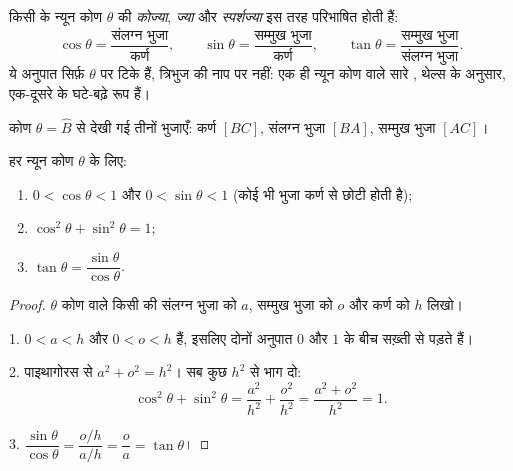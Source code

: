 \begin{definition}[त्रिकोणमितीय अनुपात]\label{def:g9:trig:ratios}
किसी  के न्यून कोण $\theta$ की \emph{कोज्या},
\emph{ज्या} और \emph{स्पर्शज्या} इस तरह
परिभाषित होती हैं:
\[
\cos\theta = \frac{\text{संलग्न भुजा}}{\text{कर्ण}},
\qquad
\sin\theta = \frac{\text{सम्मुख भुजा}}{\text{कर्ण}},
\qquad
\tan\theta = \frac{\text{सम्मुख भुजा}}{\text{संलग्न भुजा}} .
\]
ये अनुपात सिर्फ़ $\theta$ पर टिके हैं, त्रिभुज की नाप पर नहीं: एक ही
न्यून कोण वाले सारे , थेल्स के अनुसार, एक-दूसरे के
घटे-बढ़े रूप हैं।
\end{definition}

\begin{omfigure}

{\small कोण $\theta = \widehat B$ से देखी गई तीनों भुजाएँ: कर्ण
$[BC]$, संलग्न भुजा $[BA]$, सम्मुख भुजा $[AC]$।}
\end{omfigure}

\begin{proposition}[पहले गुण]\label{prop:g9:trig:properties}
हर न्यून कोण $\theta$ के लिए:
\begin{enumerate}
  \item $0 < \cos\theta < 1$ और $0 < \sin\theta < 1$ (कोई भी 
        भुजा कर्ण से छोटी होती है);
  \item $\cos^2\theta + \sin^2\theta = 1$;
  \item $\tan\theta = \dfrac{\sin\theta}{\cos\theta}$.
\end{enumerate}
\end{proposition}

\begin{proof}
$\theta$ कोण वाले किसी  की संलग्न भुजा को $a$, सम्मुख
भुजा को $o$ और कर्ण को $h$ लिखो।

1. $0 < a < h$ और $0 < o < h$ हैं, इसलिए दोनों अनुपात $0$ और $1$ के
बीच सख़्ती से पड़ते हैं।

2. पाइथागोरस से $a^2 + o^2 = h^2$। सब कुछ $h^2$ से भाग दो:
\[
\cos^2\theta + \sin^2\theta
= \frac{a^2}{h^2} + \frac{o^2}{h^2}
= \frac{a^2 + o^2}{h^2} = 1 .
\]

3. $\dfrac{\sin\theta}{\cos\theta} = \dfrac{o/h}{a/h} = \dfrac oa
= \tan\theta$।
\end{proof}

